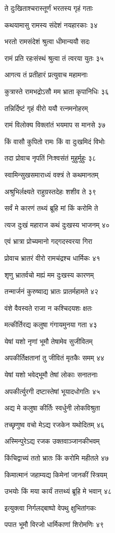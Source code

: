 ते दुःखिताश्चरास्तूर्णं भरतस्य गृहं गताः

कथयामासु रामस्य संदेशं नयहारकाः ३४

भरतो रामसंदेशं श्रुत्वा धीमान्ययौ सदः

रामं प्रति रहःसंस्थं श्रुत्वा तं त्वरया युतः ३५

आगत्य तं प्रतीहारं प्रत्युवाच महामनाः

कुत्रास्ते रामभद्रोऽसौ मम भ्राता कृपानिधिः ३६

तन्निर्दिष्टं गृहं वीरो ययौ रत्नमनोहरम्

रामं विलोक्य विक्लांतं भयमाप स मानसे ३७

किं वासौ कुपितो रामः किं वा दुःखमिदं विभोः

तदा प्रोवाच नृपतिं निःश्वसंतं मुहुर्मुहुः ३८

स्वामिन्सुखसमाराध्यं वक्त्रं ते कथमानतम्

अश्रुभिर्लक्ष्यते राहुग्रस्तदेहः शशीव ते ३९

सर्वं मे कारणं तथ्यं ब्रूहि मां किं करोमि ते

त्यज दुःखं महाराज कथं दुःखस्य भाजनम् ४०

एवं भ्रात्रा प्रोच्यमानो गद्गदस्वरया गिरा

प्रोवाच भ्रातरं वीरो रामचंद्रश्च धार्मिकः ४१

शृणु भ्रातर्वचो मह्यं मम दुःखस्य कारणम्

तन्मार्जनं कुरुष्वाद्य भ्रातः प्रातर्महामते ४२

वंशे वैवस्वते राजा न कश्चिदयशः क्षतः

मत्कीर्तिरद्य कलुषा गंगायमुनया गता ४३

येषां यशो नृणां भूमौ तेषामेव सुजीवितम्

अपकीर्तिक्षतानां तु जीवितं मृतकैः समम् ४४

येषां यशो भवेद्भूमौ तेषां लोकाः सनातनाः

अपकीर्त्युरगी दष्टास्तेषां भूयादधोगतिः ४५

अद्य मे कलुषा कीर्तिः स्वर्धुनी लोकविश्रुता

तच्छृणुष्व वचो मेऽद्य रजकेन यथोदितम् ४६

अस्मिन्पुरेऽद्य रजक उक्तवाञ्जानकीभवम्

किंचिद्वाच्यं ततो भ्रातः किं करोमि महीतले ४७

किमात्मानं जहाम्यद्य किमेनां जानकीं स्त्रियम्

उभयोः किं मया कार्यं तत्तथ्यं ब्रूहि मे भवान् ४८

इत्युक्त्वा निर्गलद्बाष्पो वेपथु क्षुभितांगकः

पपात भूमौ विरजो धार्मिकाणां शिरोमणिः ४९

